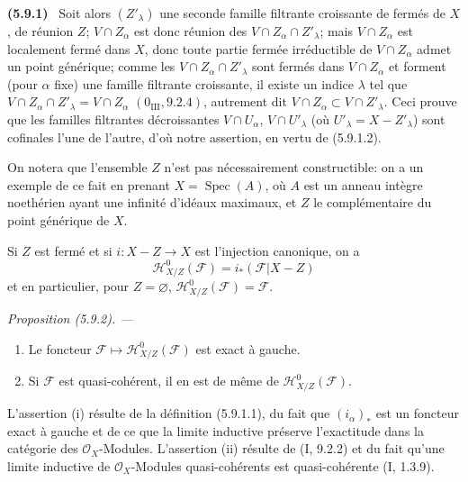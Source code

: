 \documentclass[10pt,oneside]{book}
\newcommand{\oldpage}[2][]{%
  \setcounter{footnote}{0}%
  \marginpar{\scriptsize\textbf{#1}~|~#2}\ignorespaces}
\newenvironment{env}[1][]{\par\medskip\noindent\textbf{(#1)}\ }{\par}
\newenvironment{proposition}[1][]{%
  \par\medskip\noindent\itshape Proposition (#1). ---\ }{\par}
\begin{document}
\begin{env}[5.9.1]
Soit alors $(Z'_\lambda)$ une seconde famille filtrante croissante de fermés
de $X$, de réunion $Z$; $V\cap Z_\alpha$ est donc réunion des
$V\cap Z_\alpha\cap Z'_\lambda$; mais $V\cap Z_\alpha$ est localement fermé
dans $X$, donc toute partie fermée irréductible de $V\cap Z_\alpha$ admet un
point générique; comme les $V\cap Z_\alpha\cap Z'_\lambda$ sont fermés dans
$V\cap Z_\alpha$ et forment (pour $\alpha$ fixe) une famille filtrante
croissante, il existe un indice $\lambda$ tel que
$V\cap Z_\alpha\cap Z'_\lambda=V\cap Z_\alpha$
$(0_{\mathrm{III}},9.2.4)$, autrement dit
$V\cap Z_\alpha\subset V\cap Z'_\lambda$. Ceci prouve que les familles
filtrantes décroissantes $V\cap U_\alpha$, $V\cap U'_\lambda$ (où
$U'_\lambda=X-Z'_\lambda$) sont cofinales l'une de l'autre, d'où notre
assertion, en vertu de (5.9.1.2).
\end{env}

\oldpage[IV-2]{110}

On notera que l'ensemble $Z$ n'est pas nécessairement constructible: on a un
exemple de ce fait en prenant $X=\operatorname{Spec}(A)$, où $A$ est un
anneau intègre noethérien ayant une infinité d'idéaux maximaux, et $Z$ le
complémentaire du point générique de $X$.

Si $Z$ est fermé et si $i:X-Z\to X$ est l'injection canonique, on a
\begin{equation}
\mathcal H^0_{X/Z}(\mathcal F)=i_*(\mathcal F|X-Z)
\tag{5.9.1.3}\label{IV.2.s5.9.1.3-fr}
\end{equation}
et en particulier, pour $Z=\varnothing$,
$\mathcal H^0_{X/Z}(\mathcal F)=\mathcal F$.

\begin{proposition}[5.9.2]
\label{IV.2.s5.9.2-fr}
\begin{enumerate}
\item[(i)] Le foncteur
$\mathcal F\mapsto\mathcal H^0_{X/Z}(\mathcal F)$ est exact à gauche.
\item[(ii)] Si $\mathcal F$ est quasi-cohérent, il en est de même de
$\mathcal H^0_{X/Z}(\mathcal F)$.
\end{enumerate}
\end{proposition}

L'assertion (i) résulte de la définition (5.9.1.1), du fait que
$(i_\alpha)_*$ est un foncteur exact à gauche et de ce que la limite
inductive préserve l'exactitude dans la catégorie des $\mathcal O_X$-Modules.
L'assertion (ii) résulte de (I, 9.2.2) et du fait qu'une limite inductive de
$\mathcal O_X$-Modules quasi-cohérents est quasi-cohérente (I, 1.3.9).
\end{document}
